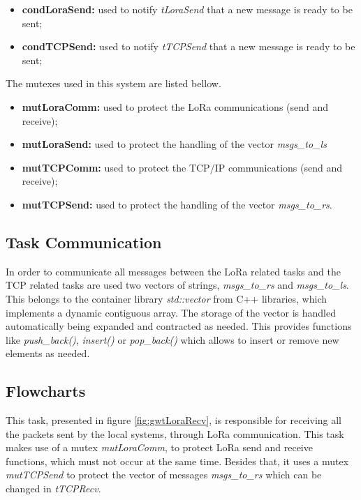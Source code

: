 \begin{itemize}
	\item \textbf{condLoraSend:} used to notify \textit{tLoraSend} that a new message is ready to be sent;
	\item \textbf{condTCPSend:} used to notify \textit{tTCPSend} that a new message is ready to be sent;
\end{itemize}

The mutexes used in this system are listed bellow.

\begin{itemize}
	\item \textbf{mutLoraComm:} used to protect the LoRa communications (send and receive);
	\item \textbf{mutLoraSend:}	used to protect the handling of the vector \textit{msgs\_to\_ls}
	
	\item \textbf{mutTCPComm:} used to protect the TCP/IP communications (send and receive);
	\item \textbf{mutTCPSend:} used to protect the handling of the vector \textit{msgs\_to\_rs}.
\end{itemize}

\subsection{Task Communication}
In order to communicate all messages between the LoRa related tasks and the TCP related tasks are used two vectors of strings, \textit{msgs\_to\_rs} and \textit{msgs\_to\_ls}. This belongs to the container library \textit{std::vector} from C++ libraries, which implements a dynamic contiguous array. The storage of the vector is handled automatically being expanded and contracted as needed. This provides functions like \textit{push\_back()}, \textit{insert()} or \textit{pop\_back()} which allows to insert or remove new elements as needed.

\subsection{Flowcharts}
This task, presented in figure \ref{fig:gwtLoraRecv}, is responsible for receiving all the packets sent by the local systems, through LoRa communication. This task makes use of a mutex \textit{mutLoraComm}, to protect LoRa send and receive functions, which must not occur at the same time. Besides that, it uses a mutex \textit{mutTCPSend} to protect the vector of messages \textit{msgs\_to\_rs} which can be changed in \textit{tTCPRecv}.


